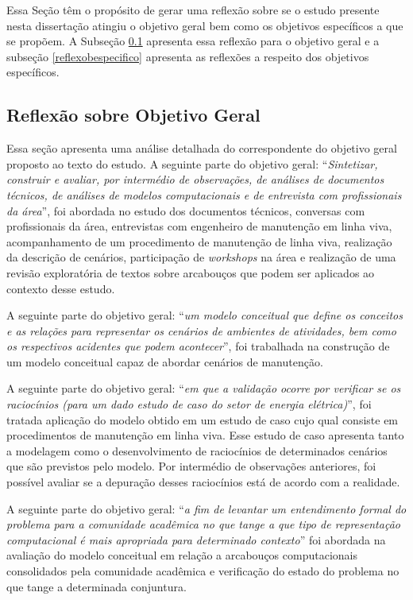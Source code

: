 Essa Seção têm o propósito de gerar uma reflexão sobre se o estudo presente nesta dissertação atingiu o objetivo geral bem como os objetivos específicos a que se propõem. A Subseção \ref{reflexobgeral} apresenta essa reflexão para o objetivo geral e a subseção \ref{reflexobespecifico} apresenta as reflexões a respeito dos objetivos específicos.

\subsection{Reflexão sobre Objetivo Geral}\label{reflexobgeral}

Essa seção apresenta uma análise detalhada do correspondente do objetivo geral proposto ao texto do estudo. A seguinte parte do objetivo geral: ``\textit{Sintetizar, construir e avaliar, por intermédio de observações, de análises de documentos técnicos, de análises de modelos computacionais e de entrevista com profissionais da área}'', foi abordada no estudo dos documentos técnicos, conversas com profissionais da área, entrevistas com engenheiro de manutenção em linha viva, acompanhamento de um procedimento de manutenção de linha viva, realização da descrição de cenários, participação de \textit{workshops} na área e realização de uma revisão exploratória de textos sobre arcabouços que podem ser aplicados ao contexto desse estudo. 

A seguinte parte do objetivo geral: ``\textit{um modelo conceitual que define os conceitos e as relações para representar os cenários de ambientes de atividades, bem como os respectivos acidentes que podem acontecer}'', foi trabalhada na construção de um modelo conceitual capaz de abordar cenários de manutenção. 

A seguinte parte do objetivo geral: ``\textit{em que a validação ocorre por verificar se os raciocínios (para um dado estudo de caso do setor de energia elétrica)}'', foi tratada aplicação do modelo obtido em um estudo de caso cujo qual consiste em procedimentos de manutenção em linha viva. Esse estudo de caso apresenta tanto a modelagem como o desenvolvimento de raciocínios de determinados cenários que são previstos pelo modelo. Por intermédio de observações anteriores, foi possível avaliar se a depuração desses raciocínios está de acordo com a realidade.  

A seguinte parte do objetivo geral: ``\textit{a fim de levantar um entendimento formal do problema para a comunidade acadêmica no que tange a que tipo de representação computacional é mais apropriada para determinado contexto}'' foi abordada na avaliação do modelo conceitual em relação a arcabouços computacionais consolidados pela comunidade acadêmica e verificação  do estado do problema no que tange a determinada conjuntura. 

